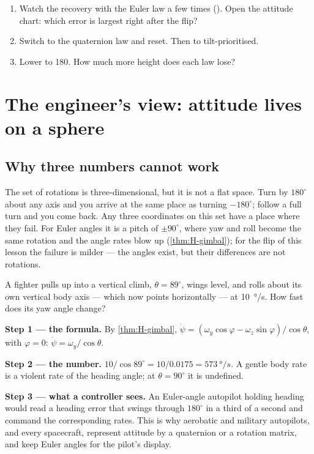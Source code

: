 \begin{trythis}
\begin{enumerate}
  \item Watch the recovery with the Euler law a few times (). Open the attitude chart: which error is largest right after the flip?
  \item Switch to the quaternion law and reset. Then to tilt-prioritised.
  \item Lower  to 180. How much more height does each law lose?
\end{enumerate}
\end{trythis}

\section{The engineer's view: attitude lives on a sphere}

\subsection{Why three numbers cannot work}
The set of rotations is three-dimensional, but it is not a flat space. Turn by $180^\circ$ about any axis and you arrive at the same place as turning $-180^\circ$; follow a full turn and you come back. Any three coordinates on this set have a place where they fail. For Euler angles it is a pitch of $\pm90^\circ$, where yaw and roll become the same rotation and the angle rates blow up (\cref{thm:H-gimbal}); for the flip of this lesson the failure is milder — the angles exist, but their differences are not rotations.

\begin{example}
\label{ex:geometric-gimbal}
A fighter pulls up into a vertical climb, $\theta = 89^\circ$, wings level, and rolls about its own vertical body axis — which now points horizontally — at \SI{10}{\degree/s}. How fast does its yaw angle change?

\textbf{Step 1 — the formula.} By \cref{thm:H-gimbal}, $\dot\psi = (\omega_y\cos\varphi - \omega_z\sin\varphi)/\cos\theta$, with $\varphi = 0$: $\dot\psi = \omega_y/\cos\theta$.

\textbf{Step 2 — the number.} $10/\cos 89^\circ = 10/0.0175 = \SI{573}{\degree/s}$. A gentle body rate is a violent rate of the heading angle; at $\theta = 90^\circ$ it is undefined.

\textbf{Step 3 — what a controller sees.} An Euler-angle autopilot holding heading would read a heading error that swings through $180^\circ$ in a third of a second and command the corresponding rates. This is why aerobatic and military autopilots, and every spacecraft, represent attitude by a quaternion or a rotation matrix, and keep Euler angles for the pilot's display.
\end{example}

